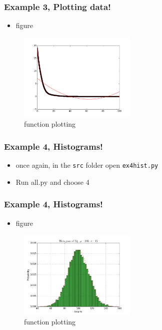 \documentclass{beamer}
\begin{document}
\begin{frame}
\frametitle{Example 3, Plotting data!}
\begin{itemize}
	\item figure 
\end{itemize}
\begin{figure}
	\centering
	\includegraphics[width=0.5\textwidth]{ex3.png}
	\caption{function plotting}
	\label{fig:function}
\end{figure}
\end{frame}

\begin{frame}
\frametitle{Example 4, Histograms!}
\begin{itemize}
\item once again, in the \texttt{src} folder open \texttt{ex4hist.py}
	\item Run all.py and choose 4 
\end{itemize}
\end{frame}

\begin{frame}
\frametitle{Example 4, Histograms!}
\begin{itemize}
\item figure
\end{itemize}
\begin{figure}
	\centering
	\includegraphics[width=0.5\textwidth]{ex4.png}
	\caption{function plotting}
	\label{fig:function}
\end{figure}
\end{frame}
\end{document}
